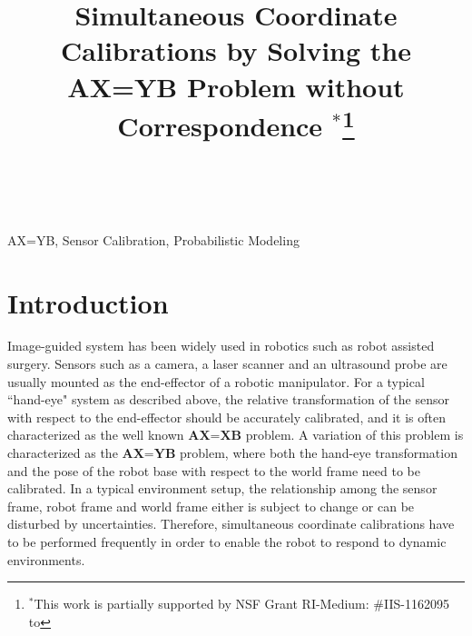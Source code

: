 \documentclass[conference,letterpaper]{IEEEtran}
\begin{document}
\title{\huge Simultaneous Coordinate Calibrations by Solving the AX=YB Problem without Correspondence $^{*}$\footnoterule\thanks{$^{*}$This work is partially
supported by NSF Grant RI-Medium: \#IIS-1162095 to }}

\author{
%
\and
{}
}%

\maketitle
\begin{abstract}

\\
\end{abstract}

\begin{keywords}
AX=YB, Sensor Calibration, Probabilistic Modeling
\end{keywords}

\section{Introduction}

Image-guided system has been widely used in robotics such as robot assisted surgery. Sensors such as a camera, a laser scanner and an ultrasound probe are usually mounted as the end-effector of a robotic manipulator. For a typical ``hand-eye" system as described above, the relative transformation of the sensor with respect to the end-effector should be accurately calibrated, and it is often characterized as the well known $\textbf{AX=XB}$ problem. A variation of this problem is characterized as the $\textbf{AX=YB}$ problem, where both the hand-eye transformation and the pose of the robot base with respect to the world frame need to be calibrated. In a typical environment setup, the relationship among the sensor frame, robot frame and world frame either is subject to change or can be disturbed by uncertainties. Therefore, simultaneous coordinate calibrations have to be performed frequently in order to enable the robot to respond to dynamic environments.
\end{document}
